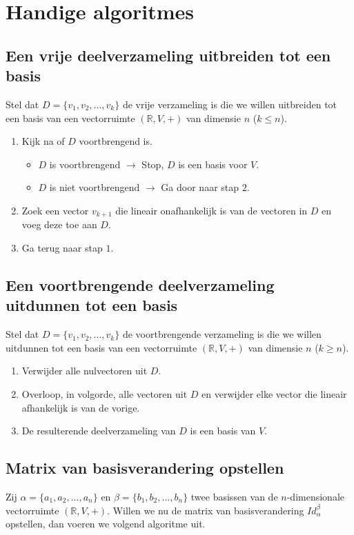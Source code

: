 \documentclass[lineaire_algebra_oplossingen.tex]{subfiles}
\begin{document}
\section{Handige algoritmes}
\subsection{Een vrije deelverzameling uitbreiden tot een basis}
Stel dat $D = \{v_1,v_2,...,v_k\}$ de vrije verzameling is die we willen uitbreiden tot een basis van een vectorruimte $(\mathbb{R},V,+)$ van dimensie $n$ ($k\le n$).
\begin{enumerate}
\item Kijk na of $D$ voortbrengend is.
\begin{itemize}
\item $D$ is voortbrengend $\rightarrow$ Stop, $D$ is een  basis voor $V$.
\item $D$ is niet voortbrengend $\rightarrow$ Ga door naar stap $2$.
\end{itemize}
\item Zoek een vector $v_{k+1}$ die lineair onafhankelijk is van de vectoren in $D$ en voeg deze toe aan $D$.
\item Ga terug naar stap $1$.
\end{enumerate}
\subsection{Een voortbrengende deelverzameling uitdunnen tot een basis}
Stel dat $D = \{v_1,v_2,...,v_k\}$ de voortbrengende verzameling is die we willen uitdunnen tot een basis van een vectorruimte $(\mathbb{R},V,+)$ van dimensie $n$ ($k\ge n$).
\begin{enumerate}
\item Verwijder alle nulvectoren uit $D$.
\item Overloop, in volgorde, alle vectoren uit $D$ en verwijder elke vector die lineair afhankelijk is van de vorige.
\item De resulterende deelverzameling van $D$ is een basis van $V$.
\end{enumerate}

\subsection{Matrix van basisverandering opstellen}
Zij $\alpha = \{a_1,a_2,...,a_n\}$ en $\beta = \{b_1,b_2,...,b_n\}$ twee basissen van de $n$-dimensionale vectorruimte $(\mathbb{R},V,+)$. Willen we nu de matrix van basisverandering $Id_\alpha^\beta$ opstellen, dan voeren we volgend algoritme uit.
\end{document}
